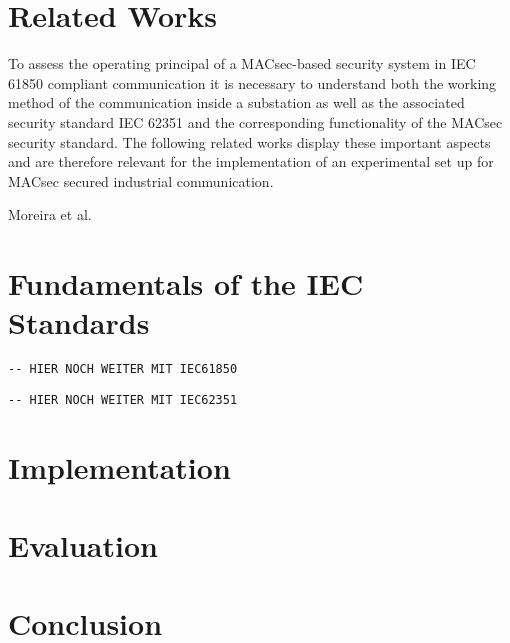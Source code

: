 \documentclass[conference]{IEEEtran}
\begin{document}
\section{Related Works}
To assess the operating principal of a MACsec-based security system in IEC 61850 compliant communication it is necessary to understand both the working 
method of the communication inside a substation as well as the associated security standard IEC 62351 and the corresponding functionality of the MACsec 
security standard. The following related works display these important aspects and are therefore relevant for the implementation of an experimental set 
up for MACsec secured industrial communication.

Moreira et al. \cite{Cybersecurity_Substation:2016}

\section{Fundamentals of the IEC Standards}
\begin{verbatim}
-- HIER NOCH WEITER MIT IEC61850
\end{verbatim}
    
\begin{verbatim}
-- HIER NOCH WEITER MIT IEC62351
\end{verbatim}

\section{Implementation}


\section{Evaluation}


\section{Conclusion}


\printbibliography
\end{document}
